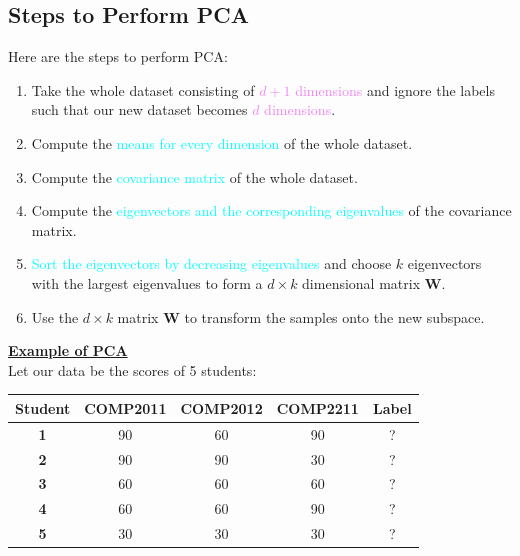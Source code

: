 \documentclass{book}
\begin{document}
\subsection{Steps to Perform PCA}
Here are the steps to perform PCA:
\begin{enumerate}
    \item Take the whole dataset consisting of \textcolor{violet}{\(d+1\) dimensions} and ignore the labels such that our new dataset becomes \textcolor{violet}{\(d\) dimensions}.
    \item Compute the \textcolor{cyan}{means for every dimension} of the whole dataset.
    \item Compute the \textcolor{cyan}{covariance matrix} of the whole dataset.
    \item Compute the \textcolor{cyan}{eigenvectors and the corresponding eigenvalues} of the covariance matrix.
    \item \textcolor{cyan}{Sort the eigenvectors by decreasing eigenvalues} and choose \(k\) eigenvectors with the largest eigenvalues to form a \(d \times k\) dimensional matrix \(\mathbf{W}\).
    \item Use the \(d \times k\) matrix \(\mathbf{W}\) to transform the samples onto the new subspace.
\end{enumerate}
\vspace{2mm}
\underline{\textbf{Example of PCA}}\\
Let our data be the scores of 5 students:
\begin{center}
    \begin{tabular}{|c|c|c|c|c|}
        \hline
        \rowcolor{lightblue}
        \textbf{Student} & \textbf{COMP2011} & \textbf{COMP2012} & \textbf{COMP2211} & \textbf{Label}\\
        \hline
        \textbf{1} & 90 & 60 & 90 & ? \\
        \hline
        \textbf{2} & 90 & 90 & 30 & ? \\
        \hline
        \textbf{3} & 60 & 60 & 60 & ? \\
        \hline
        \textbf{4} & 60 & 60 & 90 & ? \\
        \hline
        \textbf{5} & 30 & 30 & 30 & ? \\
        \hline
    \end{tabular}
\end{center}
\\
\end{document}
